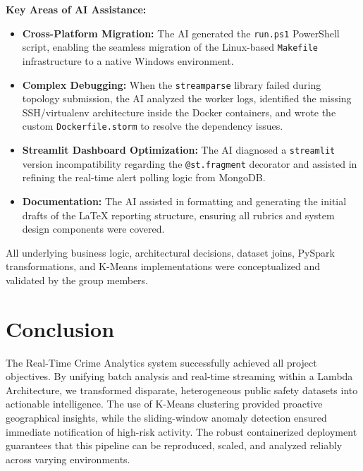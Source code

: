 \documentclass[12pt]{article}
\begin{document}
\textbf{Key Areas of AI Assistance:}
\begin{itemize}
    \item \textbf{Cross-Platform Migration:} The AI generated the \texttt{run.ps1} PowerShell script, enabling the seamless migration of the Linux-based \texttt{Makefile} infrastructure to a native Windows environment.
    \item \textbf{Complex Debugging:} When the \texttt{streamparse} library failed during topology submission, the AI analyzed the worker logs, identified the missing SSH/virtualenv architecture inside the Docker containers, and wrote the custom \texttt{Dockerfile.storm} to resolve the dependency issues.
    \item \textbf{Streamlit Dashboard Optimization:} The AI diagnosed a \texttt{streamlit} version incompatibility regarding the \texttt{@st.fragment} decorator and assisted in refining the real-time alert polling logic from MongoDB.
    \item \textbf{Documentation:} The AI assisted in formatting and generating the initial drafts of the \LaTeX{} reporting structure, ensuring all rubrics and system design components were covered.
\end{itemize}
All underlying business logic, architectural decisions, dataset joins, PySpark transformations, and K-Means implementations were conceptualized and validated by the group members.

\section{Conclusion}
The Real-Time Crime Analytics system successfully achieved all project objectives. By unifying batch analysis and real-time streaming within a Lambda Architecture, we transformed disparate, heterogeneous public safety datasets into actionable intelligence. The use of K-Means clustering provided proactive geographical insights, while the sliding-window anomaly detection ensured immediate notification of high-risk activity. The robust containerized deployment guarantees that this pipeline can be reproduced, scaled, and analyzed reliably across varying environments.
\end{document}
